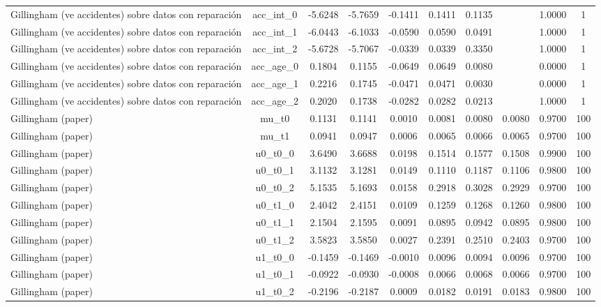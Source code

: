 \begin{table}[htbp]
\begin{tabular}{lccccccccc}
Gillingham (ve accidentes) sobre datos con reparación & acc\_int\_0 & -5.6248 & -5.7659 & -0.1411 & 0.1411 & 0.1135 &  & 1.0000 & 1 \\
Gillingham (ve accidentes) sobre datos con reparación & acc\_int\_1 & -6.0443 & -6.1033 & -0.0590 & 0.0590 & 0.0491 &  & 1.0000 & 1 \\
Gillingham (ve accidentes) sobre datos con reparación & acc\_int\_2 & -5.6728 & -5.7067 & -0.0339 & 0.0339 & 0.3350 &  & 1.0000 & 1 \\
Gillingham (ve accidentes) sobre datos con reparación & acc\_age\_0 & 0.1804 & 0.1155 & -0.0649 & 0.0649 & 0.0080 &  & 0.0000 & 1 \\
Gillingham (ve accidentes) sobre datos con reparación & acc\_age\_1 & 0.2216 & 0.1745 & -0.0471 & 0.0471 & 0.0030 &  & 0.0000 & 1 \\
Gillingham (ve accidentes) sobre datos con reparación & acc\_age\_2 & 0.2020 & 0.1738 & -0.0282 & 0.0282 & 0.0213 &  & 1.0000 & 1 \\
Gillingham (paper) & mu\_t0 & 0.1131 & 0.1141 & 0.0010 & 0.0081 & 0.0080 & 0.0080 & 0.9700 & 100 \\
Gillingham (paper) & mu\_t1 & 0.0941 & 0.0947 & 0.0006 & 0.0065 & 0.0066 & 0.0065 & 0.9700 & 100 \\
Gillingham (paper) & u0\_t0\_0 & 3.6490 & 3.6688 & 0.0198 & 0.1514 & 0.1577 & 0.1508 & 0.9900 & 100 \\
Gillingham (paper) & u0\_t0\_1 & 3.1132 & 3.1281 & 0.0149 & 0.1110 & 0.1187 & 0.1106 & 0.9800 & 100 \\
Gillingham (paper) & u0\_t0\_2 & 5.1535 & 5.1693 & 0.0158 & 0.2918 & 0.3028 & 0.2929 & 0.9700 & 100 \\
Gillingham (paper) & u0\_t1\_0 & 2.4042 & 2.4151 & 0.0109 & 0.1259 & 0.1268 & 0.1260 & 0.9800 & 100 \\
Gillingham (paper) & u0\_t1\_1 & 2.1504 & 2.1595 & 0.0091 & 0.0895 & 0.0942 & 0.0895 & 0.9800 & 100 \\
Gillingham (paper) & u0\_t1\_2 & 3.5823 & 3.5850 & 0.0027 & 0.2391 & 0.2510 & 0.2403 & 0.9700 & 100 \\
Gillingham (paper) & u1\_t0\_0 & -0.1459 & -0.1469 & -0.0010 & 0.0096 & 0.0094 & 0.0096 & 0.9700 & 100 \\
Gillingham (paper) & u1\_t0\_1 & -0.0922 & -0.0930 & -0.0008 & 0.0066 & 0.0068 & 0.0066 & 0.9700 & 100 \\
Gillingham (paper) & u1\_t0\_2 & -0.2196 & -0.2187 & 0.0009 & 0.0182 & 0.0191 & 0.0183 & 0.9800 & 100 \\

\end{tabular}
\end{table}
